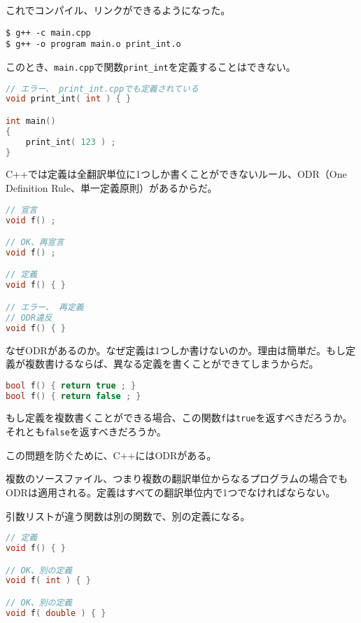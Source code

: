 これでコンパイル、リンクができるようになった。

\begin{lstlisting}[style=terminal]
$ g++ -c main.cpp
$ g++ -o program main.o print_int.o
\end{lstlisting}

このとき、\texttt{main.cpp}で関数\texttt{print\_int}を定義することはできない。

\begin{lstlisting}[language={C++}]
// エラー、 print_int.cppでも定義されている
void print_int( int ) { }

int main()
{
    print_int( 123 ) ;
}
\end{lstlisting}

C++では定義は全翻訳単位に1つしか書くことができないルール、ODR（One Definition Rule、単一定義原則）があるからだ。

\begin{lstlisting}[language={C++}]
// 宣言
void f() ;

// OK、再宣言
void f() ;

// 定義
void f() { }

// エラー、 再定義
// ODR違反
void f() { }
\end{lstlisting}

なぜODRがあるのか。なぜ定義は1つしか書けないのか。理由は簡単だ。もし定義が複数書けるならば、異なる定義を書くことができてしまうからだ。

\begin{lstlisting}[language={C++}]
bool f() { return true ; }
bool f() { return false ; }
\end{lstlisting}

もし定義を複数書くことができる場合、この関数\texttt{f}は\texttt{true}を返すべきだろうか。それとも\texttt{false}を返すべきだろうか。

この問題を防ぐために、C++にはODRがある。

複数のソースファイル、つまり複数の翻訳単位からなるプログラムの場合でもODRは適用される。定義はすべての翻訳単位内で1つでなければならない。

引数リストが違う関数は別の関数で、別の定義になる。

\begin{lstlisting}[language={C++}]
// 定義
void f() { }

// OK、別の定義
void f( int ) { }

// OK、別の定義
void f( double ) { }
\end{lstlisting}

